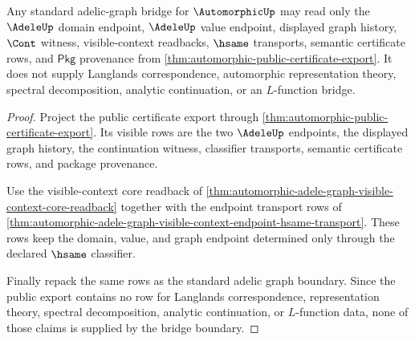 \begin{theorem}
\label{thm:automorphic-standard-adelic-graph-bridge-boundary}
Any standard adelic-graph bridge for $\AutomorphicUp$ may read only the
$\AdeleUp$ domain endpoint, $\AdeleUp$ value endpoint, displayed graph history,
$\Cont$ witness, visible-context readbacks, $\hsame$ transports, semantic
certificate rows, and $\mathsf{Pkg}$ provenance from
\autoref{thm:automorphic-public-certificate-export}. It does not supply
Langlands correspondence, automorphic representation theory, spectral
decomposition, analytic continuation, or an $L$-function bridge.
\end{theorem}
\begin{proof}
Project the public certificate export through
\autoref{thm:automorphic-public-certificate-export}. Its visible rows are the
two $\AdeleUp$ endpoints, the displayed graph history, the continuation witness,
classifier transports, semantic certificate rows, and package provenance.

Use the visible-context core readback of
\autoref{thm:automorphic-adele-graph-visible-context-core-readback} together
with the endpoint transport rows of
\autoref{thm:automorphic-adele-graph-visible-context-endpoint-hsame-transport}.
These rows keep the domain, value, and graph endpoint determined only through
the declared $\hsame$ classifier.

Finally repack the same rows as the standard adelic graph boundary. Since the
public export contains no row for Langlands correspondence, representation
theory, spectral decomposition, analytic continuation, or $L$-function data,
none of those claims is supplied by the bridge boundary.
\end{proof}

